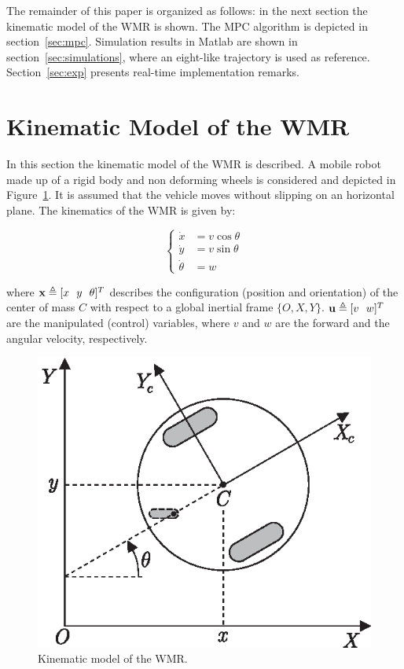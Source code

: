 \documentclass[conference]{IEEEtran} %
\begin{document}
The remainder of this paper is organized as follows: in the next section the
kinematic model of the WMR is shown. The MPC algorithm is depicted in
section~\ref{sec:mpc}. Simulation results in {\sc Matlab} are shown in
section~\ref{sec:simulations}, where an eight-like trajectory is used as
reference. Section~\ref{sec:exp} presents real-time implementation remarks.


\section{Kinematic Model of the WMR}
\label{sec:model}

In this section the kinematic model of the WMR is described. A mobile robot
made up of a rigid body and non deforming wheels is considered and depicted
in Figure~\ref{fig:robot}. It is assumed that the vehicle moves without
slipping on an horizontal plane. The kinematics of the WMR is given by:

\begin{equation}
\label{eqn:model}
	\left\{
		\begin{aligned}
			\dot x	  &= v\cos\theta \\
			\dot y	  &= v\sin\theta \\
			\dot \theta &= w
		\end{aligned}
	\right.
\end{equation}

\noindent where ${\bf x}\triangleq[x~~y~~\theta]^T$ describes the
configuration (position and orientation) of the center of mass $C$ with
respect to a global inertial frame $\{O,X,Y\}$. ${\bf u}\triangleq[v~~w]^T$
are the manipulated (control) variables, where $v$ and $w$ are the forward
and the angular velocity, respectively.

\begin{figure}[htbp]
\begin{center}
    \includegraphics[width=0.67\linewidth]{Figures/robot.eps}
    \caption{Kinematic model of the WMR.}
    \label{fig:robot}
\end{center}
\end{figure}
\end{document}
